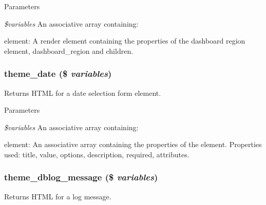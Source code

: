 \begin{DoxyParams}{Parameters}
\item[{\em \$variables}]An associative array containing:
\begin{DoxyItemize}
\item element: A render element containing the properties of the dashboard region element, dashboard\_\-region and children. 
\end{DoxyItemize}\end{DoxyParams}
\hypertarget{group__themeable_ga78957bb9be7b270a6d3ec9ea26b4bf3e}{
\subsubsection[{theme\_\-date}]{\setlength{\rightskip}{0pt plus 5cm}theme\_\-date (\$ {\em variables})}}
\label{group__themeable_ga78957bb9be7b270a6d3ec9ea26b4bf3e}
Returns HTML for a date selection form element.


\begin{DoxyParams}{Parameters}
\item[{\em \$variables}]An associative array containing:
\begin{DoxyItemize}
\item element: An associative array containing the properties of the element. Properties used: title, value, options, description, required, attributes. 
\end{DoxyItemize}\end{DoxyParams}
\hypertarget{group__themeable_ga4f279aabc6c186be3cf3a04b6bb94f8a}{
\subsubsection[{theme\_\-dblog\_\-message}]{\setlength{\rightskip}{0pt plus 5cm}theme\_\-dblog\_\-message (\$ {\em variables})}}
\label{group__themeable_ga4f279aabc6c186be3cf3a04b6bb94f8a}
Returns HTML for a log message.


